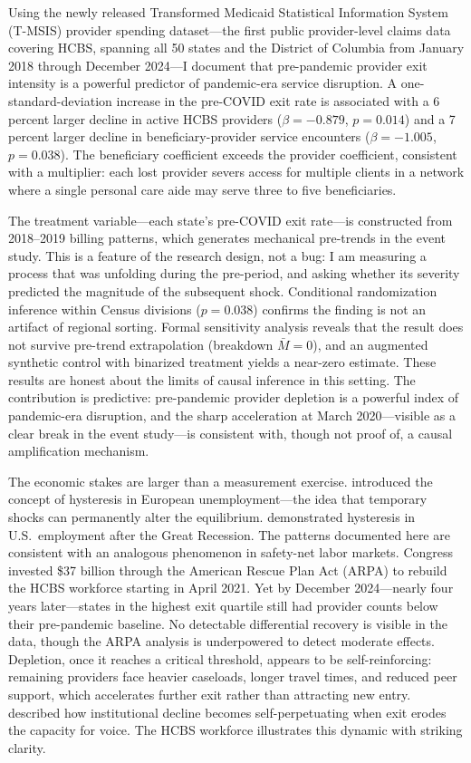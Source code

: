 \documentclass[12pt]{article}
\begin{document}
Using the newly released Transformed Medicaid Statistical Information System (T-MSIS) provider spending dataset---the first public provider-level claims data covering HCBS, spanning all 50 states and the District of Columbia from January 2018 through December 2024---I document that pre-pandemic provider exit intensity is a powerful predictor of pandemic-era service disruption. A one-standard-deviation increase in the pre-COVID exit rate is associated with a 6 percent larger decline in active HCBS providers ($\beta = -0.879$, $p = 0.014$) and a 7 percent larger decline in beneficiary-provider service encounters ($\beta = -1.005$, $p = 0.038$). The beneficiary coefficient exceeds the provider coefficient, consistent with a multiplier: each lost provider severs access for multiple clients in a network where a single personal care aide may serve three to five beneficiaries.

The treatment variable---each state's pre-COVID exit rate---is constructed from 2018--2019 billing patterns, which generates mechanical pre-trends in the event study. This is a feature of the research design, not a bug: I am measuring a process that was unfolding during the pre-period, and asking whether its severity predicted the magnitude of the subsequent shock. Conditional randomization inference within Census divisions ($p = 0.038$) confirms the finding is not an artifact of regional sorting. Formal sensitivity analysis \citep{rambachan2023} reveals that the result does not survive pre-trend extrapolation (breakdown $\bar{M} = 0$), and an augmented synthetic control \citep{benmichael2021} with binarized treatment yields a near-zero estimate. These results are honest about the limits of causal inference in this setting. The contribution is predictive: pre-pandemic provider depletion is a powerful index of pandemic-era disruption, and the sharp acceleration at March 2020---visible as a clear break in the event study---is consistent with, though not proof of, a causal amplification mechanism.

The economic stakes are larger than a measurement exercise. \citet{blanchardsummers1986} introduced the concept of hysteresis in European unemployment---the idea that temporary shocks can permanently alter the equilibrium. \citet{yagan2019} demonstrated hysteresis in U.S.\ employment after the Great Recession. The patterns documented here are consistent with an analogous phenomenon in safety-net labor markets. Congress invested \$37 billion through the American Rescue Plan Act (ARPA) to rebuild the HCBS workforce starting in April 2021. Yet by December 2024---nearly four years later---states in the highest exit quartile still had provider counts below their pre-pandemic baseline. No detectable differential recovery is visible in the data, though the ARPA analysis is underpowered to detect moderate effects. Depletion, once it reaches a critical threshold, appears to be self-reinforcing: remaining providers face heavier caseloads, longer travel times, and reduced peer support, which accelerates further exit rather than attracting new entry. \citet{hirschman1970} described how institutional decline becomes self-perpetuating when exit erodes the capacity for voice. The HCBS workforce illustrates this dynamic with striking clarity.
\end{document}
